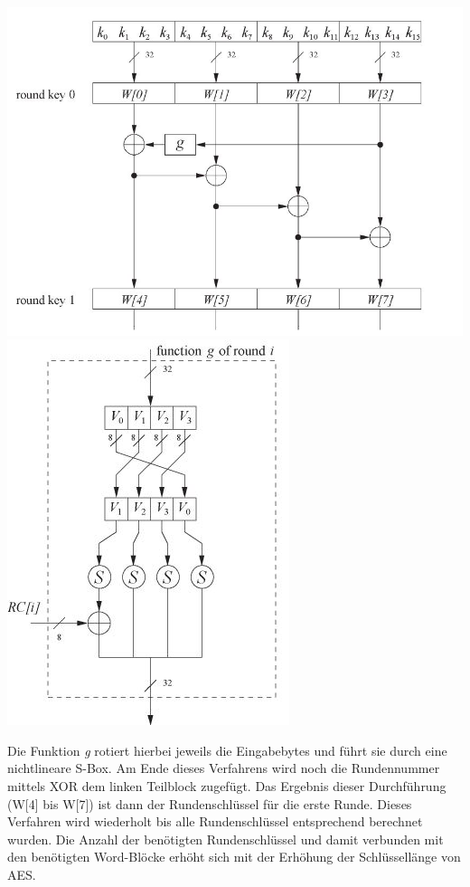 \documentclass[10pt, a4paper,headsepline]{scrreprt}
\begin{document}
\includegraphics[scale=0.4]{key_sched_1_round.JPG} 
\includegraphics[scale=0.55]{aes_key_sched_function_g.JPG}
\hfill

Die Funktion \textit{g} rotiert hierbei jeweils die Eingabebytes und führt sie durch eine nichtlineare S-Box. Am Ende dieses Verfahrens wird noch die Rundennummer mittels XOR dem linken Teilblock zugefügt. Das Ergebnis dieser Durchführung (W[4] bis W[7]) ist dann der Rundenschlüssel für die erste Runde. Dieses Verfahren wird wiederholt bis alle Rundenschlüssel entsprechend berechnet wurden. Die Anzahl der benötigten Rundenschlüssel und damit verbunden mit den benötigten Word-Blöcke erhöht sich mit der Erhöhung der Schlüssellänge von AES.
\end{document}
